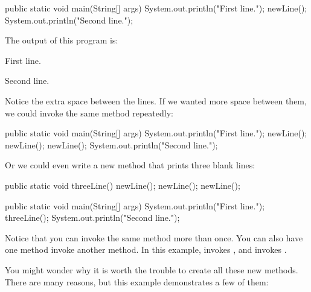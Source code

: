 \begin{code}
    public static void main(String[] args) {
        System.out.println("First line.");
        newLine();
        System.out.println("Second line.");
    }
\end{code}

The output of this program is:

\begin{stdout}
First line.

Second line.
\end{stdout}

Notice the extra space between the lines.
If we wanted more space between them, we could invoke the same method repeatedly:

\begin{code}
    public static void main(String[] args) {
        System.out.println("First line.");
        newLine();
        newLine();
        newLine();
        System.out.println("Second line.");
    }
\end{code}

Or we could even write a new method that prints three blank lines:

\begin{code}
    public static void threeLine() {
        newLine();
        newLine();
        newLine();
    }

    public static void main(String[] args) {
        System.out.println("First line.");
        threeLine();
        System.out.println("Second line.");
    }
\end{code}

Notice that you can invoke the same method more than once.
You can also have one method invoke another method.
In this example,  invokes , and  invokes .


You might wonder why it is worth the trouble to create all these new methods.
There are many reasons, but this example demonstrates a few of them:


